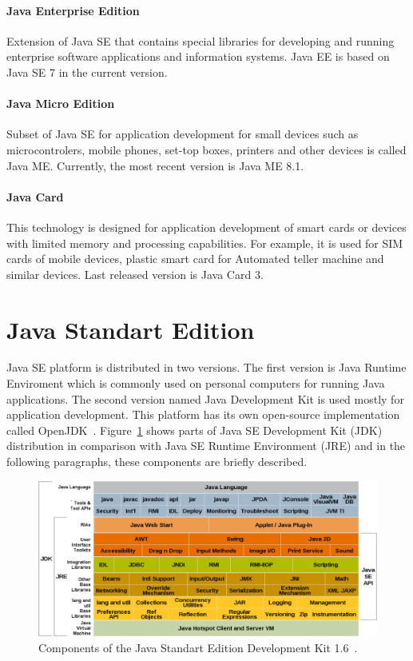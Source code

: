\paragraph{Java Enterprise Edition}
Extension of Java SE that contains special libraries for developing and running enterprise software applications and
information systems. Java EE is based on Java SE 7 in the current version.

\paragraph{Java Micro Edition}
Subset of Java SE for application development for small devices such as microcontrolers, mobile phones, set-top boxes,
printers and other devices is called Java ME. Currently, the most recent version is Java ME 8.1.

\paragraph{Java Card}
This technology is designed for application development of smart cards or devices with limited memory and processing
capabilities. For example, it is used for SIM cards of mobile devices, plastic smart card for Automated teller machine
and similar devices. Last released version is Java Card 3.

\section{Java Standart Edition}\label{JavaSE}
Java SE platform is distributed in two versions. The first version is Java Runtime Enviroment which is commonly used on
personal computers for running Java applications. The second version named Java Development Kit is used mostly for
application development. This platform has its own open-source implementation called OpenJDK~\cite{OpenJDK}.
Figure~\ref{Java6JDK} shows parts of Java SE Development Kit (JDK) distribution in comparison with Java SE Runtime
Environment (JRE) and in the following paragraphs, these components are briefly described.
\\
\begin{figure}[h!]
    \centering
    \includegraphics[scale=0.35]{fig/java_6_jdk.png}
    \caption{Components of the Java Standart Edition Development Kit 1.6~\cite{Java6Doc}.}
    \label{Java6JDK}
\end{figure}

